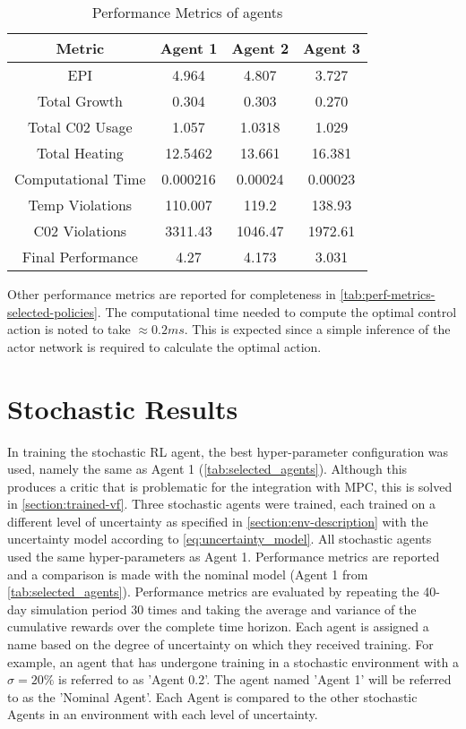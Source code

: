 \begin{table}[H]
    \centering
    \begin{tabular}{|c|c|c|c|}
    \hline
         Metric& Agent 1 & Agent 2 & Agent 3  \\
         \hline
         EPI                &4.964      & 4.807     &3.727 \\
         Total Growth       &0.304      &0.303      &0.270 \\
         Total C02 Usage    &1.057      &1.0318     &1.029 \\
         Total Heating      &12.5462    &13.661     &16.381 \\
         Computational Time &0.000216   &0.00024    &0.00023 \\
         Temp Violations    &110.007    &119.2      &138.93 \\
         C02 Violations     &3311.43    &1046.47    &1972.61 \\
          Final Performance &4.27       &4.173      &3.031 \\ 
         \hline
    \end{tabular}
    \caption{Performance Metrics of agents}
    \label{tab:perf-metrics-selected-policies}
\end{table}


 Other performance metrics are reported for completeness in \autoref{tab:perf-metrics-selected-policies}. The computational time needed to compute the optimal control action is noted to take $\approx 0.2ms$. This is expected since a simple inference of the actor network is required to calculate the optimal action.
 
\section{Stochastic Results}
In training the stochastic RL agent, the best hyper-parameter configuration was used, namely the same as Agent 1 (\autoref{tab:selected_agents}). Although this produces a critic that is problematic for the integration with MPC, this is solved in \autoref{section:trained-vf}. Three stochastic agents were trained, each trained on a different level of uncertainty as specified in \autoref{section:env-description} with the uncertainty model according to \autoref{eq:uncertainty_model}. All stochastic agents used the same hyper-parameters as Agent 1. Performance metrics are reported and a comparison is made with the nominal model (Agent 1 from \autoref{tab:selected_agents}). Performance metrics are evaluated by repeating the 40-day simulation period 30 times and taking the average and variance of the cumulative rewards over the complete time horizon.
Each agent is assigned a name based on the degree of uncertainty on which they received training. For example, an agent that has undergone training in a stochastic environment with a $\sigma = 20\%$ is referred to as 'Agent 0.2'. The agent named 'Agent 1' will be referred to as the 'Nominal Agent'. Each Agent is compared to the other stochastic Agents in an environment with each level of uncertainty.

